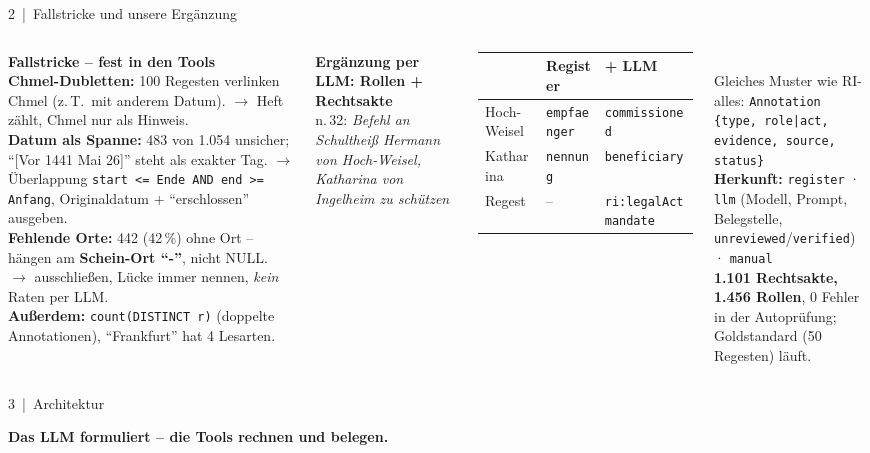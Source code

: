 \documentclass[10pt,aspectratio=169]{beamer}
\newcommand{\code}[1]{\texttt{#1}}
\begin{document}
\begin{frame}{2 \,|\, Fallstricke und unsere Ergänzung}
\begin{columns}[T]
\textbf{Fallstricke -- fest in den Tools}\\[1mm]
\footnotesize
\textbf{Chmel-Dubletten:} 100 Regesten verlinken Chmel (z.\,T.\ mit anderem Datum).
$\to$ Heft zählt, Chmel nur als Hinweis.\\[1.5mm]
\textbf{Datum als Spanne:} 483 von 1.054 unsicher; \enquote{[Vor 1441 Mai 26]} steht als exakter Tag.
$\to$ Überlappung \code{start <= Ende AND end >= Anfang}, Originaldatum + \enquote{erschlossen} ausgeben.\\[1.5mm]
\textbf{Fehlende Orte:} 442 (42\,\%) ohne Ort -- hängen am \textbf{Schein-Ort \enquote{-}}, nicht NULL.
$\to$ ausschließen, Lücke immer nennen, \emph{kein} Raten per LLM.\\[1.5mm]
\textbf{Außerdem:} \code{count(DISTINCT r)} (doppelte Annotationen), \enquote{Frankfurt} hat 4 Lesarten.

\textbf{Ergänzung per LLM: Rollen + Rechtsakte}\\[1mm]
\footnotesize
n.\,32: \emph{Befehl an Schultheiß Hermann von Hoch-Weisel, Katharina von Ingelheim zu schützen}\\[1mm]
\begin{tabular}{@{}lll@{}}
\toprule
& Register & + LLM\\\midrule
Hoch-Weisel & \code{empfaenger} & \code{commissioned}\\
Katharina & \code{nennung} & \code{beneficiary}\\
Regest & -- & \code{ri:legalAct mandate}\\
\bottomrule
\end{tabular}\\[1.5mm]
Gleiches Muster wie RI-alles: \code{Annotation \{type, role|act,}\\\code{evidence, source, status\}}\\[1mm]
\textbf{Herkunft:} \code{register} · \code{llm} (Modell, Prompt, Belegstelle, \code{unreviewed}/\code{verified}) · \code{manual}\\[1mm]
\textbf{1.101 Rechtsakte, 1.456 Rollen}, 0 Fehler in der Autoprüfung; Goldstandard (50 Regesten) läuft.
\end{columns}
\end{frame}

\begin{frame}{3 \,|\, Architektur}
\begin{center}
\resizebox{!}{0.72\textheight}{}
\end{center}
\vspace{-1mm}
\centering\large\textbf{Das LLM formuliert -- die Tools rechnen und belegen.}
\end{frame}
\end{document}
